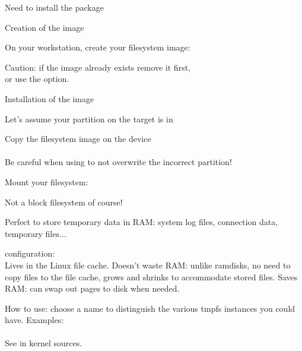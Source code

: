   \startitemize
  \item Need to install the  package
  \item Creation of the image
    \startitemize
    \item On your workstation, create your filesystem image:\\
    \item Caution: if the image already exists remove it first,\\
      or use the  option.
    \stopitemize
  \item Installation of the image
    \startitemize
    \item Let's assume your partition on the target is in
    \item Copy the filesystem image on the device\\
      \\
      Be careful when using  to not overwrite the incorrect
      partition!
    \stopitemize
  \item Mount your filesystem:\\
  \stopitemize


  Not a block filesystem of course!

  Perfect to store temporary data in RAM: system log files, connection
  data, temporary files...

  \startitemize
  \item {} configuration: \\
    Lives in the Linux file cache. Doesn't waste RAM: unlike ramdisks, no need
    to copy files to the file cache, grows and shrinks to accommodate stored files.
    Saves RAM: can swap out pages to disk when needed.
  \item How to use: choose a name to distinguish the various tmpfs
    instances you could have. Examples:\\
    \\
  \stopitemize
  See  in kernel sources.

